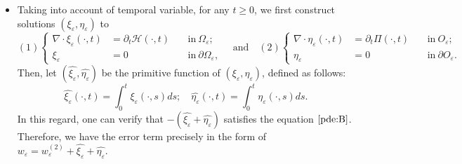 \documentclass[13pt,CJK]{article}
\theoremstyle{plain}                       %
\theoremstyle{remark}
\numberwithin{equation}{section}
\def\Xint#1{\mathchoice
  {\XXint\displaystyle\textstyle{#1}}%
  {\XXint\textstyle\scriptstyle{#1}}%
  {\XXint\scriptstyle\scriptscriptstyle{#1}}%
  {\XXint\scriptscriptstyle\scriptscriptstyle{#1}}%
  \!\int}
\def\XXint#1#2#3{{\setbox0=\hbox{$#1{#2#3}{\int}$}
  \vcenter{\hbox{$#2#3$}}\kern-.5\wd0}}
\def\dashint{\Xint-}
\begin{document}
\begin{itemize}
\begin{itemize}
\begin{equation}
\begin{aligned}
&O_\varepsilon = \bigcup_{i}O_\varepsilon^{i}
\quad\text{and}\quad
|O_\varepsilon^i| \sim \varepsilon^d,
\end{aligned}
\end{equation}
in which $O_\varepsilon^{i}$ is approximately an $d$-dimensional cube obtained by cutting the $O_\varepsilon$ in the normal direction $\vec{n}$ associated with $\partial\Omega$ (see Remark $\ref{remark:4.1}$).
Then, we have
\begin{equation*}
  J_1+J_2 = \underbrace{J_1 - \sum_{i} (\dashint_{O_{\varepsilon}^i}J_1)
1_{O_{\varepsilon}^i}}_{\Pi}
+ \underbrace{\sum_{i} (\dashint_{O_{\varepsilon}^i}J_1)
1_{O_{\varepsilon}^i} + J_2}_{\mathcal{H}}.
\end{equation*}
Thereupon, it is possible to split the equation $\eqref{pde:B}$
to have some meaningful estimates, since $\Pi$ and $\mathcal{H}$ satisfy the compatibility conditions:
$\int_{O_\varepsilon}\Pi = 0$ and
$\int_{\Omega_\varepsilon}\mathcal{H} = 0$, respectively;

    \item Taking into account of temporal variable,
    for any $t\geq 0$, we first construct
solutions $(\xi_{\varepsilon},\eta_{\varepsilon})$ to
\begin{equation}\label{pde:C}
(1)\left\{\begin{aligned}
 \nabla\cdot \xi_{\varepsilon}(\cdot,t) &= \partial_t\mathcal{H}(\cdot,t) &~&\text{in}~\Omega_\varepsilon;\\
  \xi_{\varepsilon} &= 0 &~&\text{in}~\partial \Omega_\varepsilon,
\end{aligned}\right.
\quad \text{and} \quad
(2)\left\{\begin{aligned}
 \nabla\cdot \eta_{\varepsilon}(\cdot,t) &= \partial_t\Pi(\cdot,t) &~&\text{in}~O_\varepsilon;\\
  \eta_{\varepsilon} &= 0 &~&\text{in}~\partial O_\varepsilon.
\end{aligned}\right.
\end{equation}
Then, let $(\hat{\xi_{\varepsilon}},\hat{\eta_{\varepsilon}})$ be the primitive function of
$(\xi_{\varepsilon},\eta_{\varepsilon})$, defined as follows:
\begin{equation}\label{pde3.11}
  \hat{\xi_{\varepsilon}}(\cdot,t)=\int_{0}^{t}\xi_{\varepsilon}(\cdot,s)ds;\quad
  \hat{\eta_{\varepsilon}}(\cdot,t)=\int_{0}^{t}\eta_{\varepsilon}(\cdot,s)ds.
\end{equation}
In this regard, one can
verify that $-(\hat{\xi_{\varepsilon}}+\hat{\eta_{\varepsilon}})$ satisfies
the equation $\eqref{pde:B}$. Therefore, we have the error term
precisely in the form of
$  w_\varepsilon = w_\varepsilon^{(2)}+ \hat{\xi_{\varepsilon}}+\hat{\eta_{\varepsilon}}$.
\end{itemize}
\end{itemize}
\end{document}
